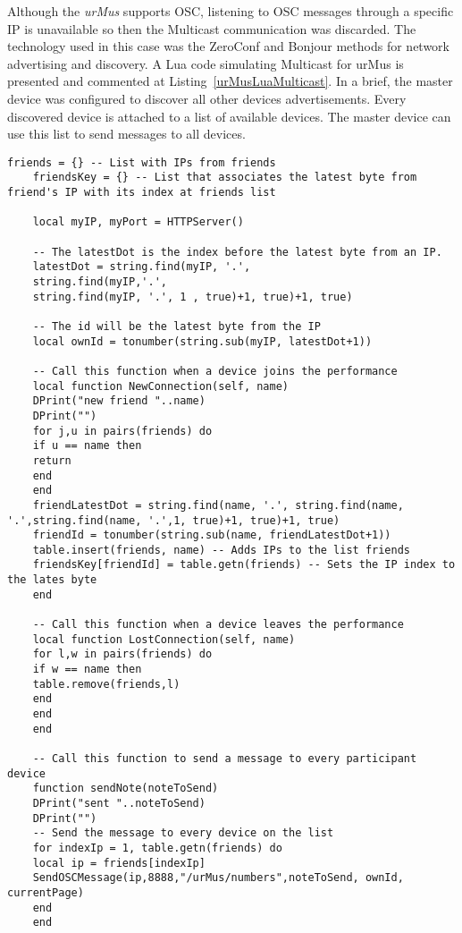 Although the \textit{urMus} supports OSC, listening to OSC messages through a specific IP is unavailable so then the Multicast communication was discarded.
The technology used in this case was the ZeroConf and Bonjour methods for network advertising and discovery.
A Lua code simulating Multicast for urMus is presented and commented at Listing~\ref{urMusLuaMulticast}.
In a brief, the master device was configured to discover all other devices advertisements.
Every discovered device is attached to a list of available devices.
The master device can use this list to send messages to all devices.

\begin{footnotesize}
	\lstset{language=Java, caption=Example of Lua code used at urMus platform for Multicasting in LAN, captionpos=b, label=urMusLuaMulticast, numbers=none, numberstyle=\scriptsize}
	\begin{lstlisting}[frame=single]
	friends = {} -- List with IPs from friends
	friendsKey = {} -- List that associates the latest byte from friend's IP with its index at friends list
	
	local myIP, myPort = HTTPServer()
	
	-- The latestDot is the index before the latest byte from an IP.
	latestDot = string.find(myIP, '.', 
	string.find(myIP,'.',
	string.find(myIP, '.', 1 , true)+1, true)+1, true)
	
	-- The id will be the latest byte from the IP
	local ownId = tonumber(string.sub(myIP, latestDot+1))
	
	-- Call this function when a device joins the performance
	local function NewConnection(self, name)
	DPrint("new friend "..name)
	DPrint("")
	for j,u in pairs(friends) do
	if u == name then
	return
	end
	end
	friendLatestDot = string.find(name, '.', string.find(name, '.',string.find(name, '.',1, true)+1, true)+1, true)
	friendId = tonumber(string.sub(name, friendLatestDot+1))
	table.insert(friends, name) -- Adds IPs to the list friends
	friendsKey[friendId] = table.getn(friends) -- Sets the IP index to the lates byte
	end
	
	-- Call this function when a device leaves the performance
	local function LostConnection(self, name)
	for l,w in pairs(friends) do
	if w == name then
	table.remove(friends,l)
	end
	end
	end
	
	-- Call this function to send a message to every participant device
	function sendNote(noteToSend)
	DPrint("sent "..noteToSend)
	DPrint("")
	-- Send the message to every device on the list
	for indexIp = 1, table.getn(friends) do
	local ip = friends[indexIp]
	SendOSCMessage(ip,8888,"/urMus/numbers",noteToSend, ownId, currentPage)
	end
	end
	

\end{lstlisting}
\end{footnotesize}
